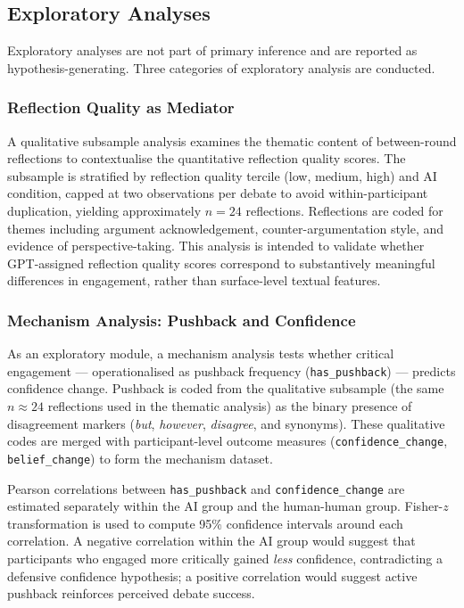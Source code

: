 \subsection{Exploratory Analyses}

Exploratory analyses are not part of primary inference and are reported
as hypothesis-generating. Three categories of exploratory analysis are
conducted.

\subsubsection{Reflection Quality as Mediator}

A qualitative subsample analysis examines the thematic content of
between-round reflections to contextualise the quantitative reflection
quality scores. The subsample is stratified by reflection quality tercile
(low, medium, high) and AI condition, capped at two observations per
debate to avoid within-participant duplication, yielding approximately
$n = 24$ reflections. Reflections are coded for themes including
argument acknowledgement, counter-argumentation style, and evidence
of perspective-taking. This analysis is intended to validate whether
GPT-assigned reflection quality scores correspond to substantively
meaningful differences in engagement, rather than surface-level
textual features.

\subsubsection{Mechanism Analysis: Pushback and Confidence}

As an exploratory module, a mechanism analysis
tests whether critical engagement --- operationalised as pushback
frequency (\texttt{has\_pushback}) --- predicts confidence change.
Pushback is coded from the qualitative subsample (the same
$n \approx 24$ reflections used in the thematic analysis) as the
binary presence of disagreement markers (\textit{but},
\textit{however}, \textit{disagree}, and synonyms). These qualitative
codes are merged with participant-level outcome measures
(\texttt{confidence\_change}, \texttt{belief\_change}) to form the
mechanism dataset.

Pearson correlations between \texttt{has\_pushback} and
\texttt{confidence\_change} are estimated separately within the AI
group and the human-human group. Fisher-$z$ transformation is used
to compute 95\% confidence intervals around each correlation. A
negative correlation within the AI group would suggest that
participants who engaged more critically gained \textit{less}
confidence, contradicting a defensive confidence hypothesis; a
positive correlation would suggest active pushback reinforces
perceived debate success.

